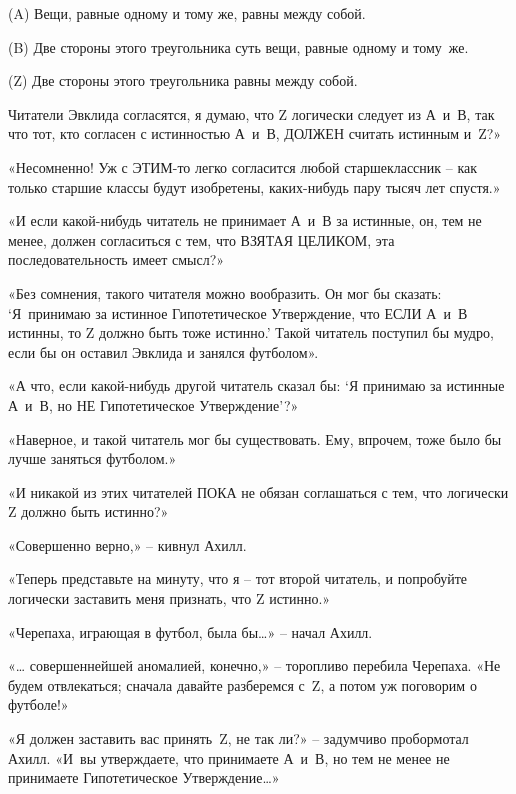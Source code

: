 \documentclass[../main.tex]{subfiles}
\begin{document}
\begin{statements}
    \item[(A)] Вещи, равные одному и тому же, равны между собой.
    \item[(B)] Две стороны этого треугольника суть вещи, равные одному и тому~же.
    \item[(Z)] Две стороны этого треугольника равны между собой.
\end{statements}

Читатели Эвклида согласятся, я думаю, что Z логически следует из А~и~В, так что тот, кто согласен с истинностью А~и~В, ДОЛЖЕН считать истинным и~Z?»

«Несомненно! Уж с ЭТИМ-то легко согласится любой старшеклассник \--- как только старшие классы будут изобретены, каких-нибудь пару тысяч лет спустя.»

«И если какой-нибудь читатель не принимает А~и~В за истинные, он, тем не менее, должен согласиться с тем, что ВЗЯТАЯ ЦЕЛИКОМ, эта последовательность имеет смысл?»

«Без сомнения, такого читателя можно вообразить. Он мог бы сказать: \enquote*{Я~принимаю за истинное Гипотетическое Утверждение, что ЕСЛИ А~и~В истинны, то Z должно быть тоже истинно.} Такой читатель поступил бы мудро, если бы он оставил Эвклида и занялся футболом».

«А что, если какой-нибудь другой читатель сказал бы: \enquote*{Я принимаю за истинные А~и~В, но НЕ Гипотетическое Утверждение}?»

«Наверное, и такой читатель мог бы существовать. Ему, впрочем, тоже было бы лучше заняться футболом.»

«И никакой из этих читателей ПОКА не обязан соглашаться с тем, что логически Z должно быть истинно?»

«Совершенно верно,» \--- кивнул Ахилл.

«Теперь представьте на минуту, что я \--- тот второй читатель, и попробуйте логически заставить меня признать, что Z истинно.»

«Черепаха, играющая в футбол, была бы\ldots» \--- начал Ахилл.

«\ldots{} совершеннейшей аномалией, конечно,» \--- торопливо перебила Черепаха. «Не будем отвлекаться; сначала давайте разберемся с~Z, а потом уж поговорим о футболе!»

«Я должен заставить вас принять~Z, не так ли?» \--- задумчиво пробормотал Ахилл. «И~вы утверждаете, что принимаете А~и~В, но тем не менее не принимаете Гипотетическое Утверждение\ldots»
\end{document}
